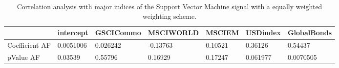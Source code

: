 \begin{table}[H]
\centering
\begin{tabular}{lllllll}
\hline& intercept & GSCICommo & MSCIWORLD & MSCIEM & USDindex & GlobalBonds \\ 
\hline 
Coefficient AF & 0.0051006 & 0.026242 & -0.13763 & 0.10521 & 0.36126 & 0.54437 \\ 
pValue AF & 0.03539 & 0.55796 & 0.16929 & 0.17247 & 0.061977 & 0.0070505 \\ 
\hline
\end{tabular}
\caption{Correlation analysis with major indices of the Support Vector Machine signal with a equally weighted weighting scheme.}
\label{SVM_MODEL_EW_AFACTOR}
\end{table}